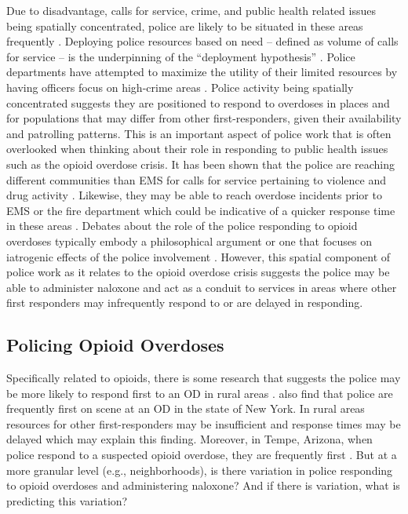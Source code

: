 Due to disadvantage, calls for service, crime, and public health related issues being spatially concentrated, police are likely to be situated in these areas frequently \parencite{engel_race_2012, mitchell_criminal_2011}. Deploying police resources based on need – defined as volume of calls for service – is the underpinning of the “deployment hypothesis” \parencite{alexander_war_2010, beckett_penal_2010}. Police departments have attempted to maximize the utility of their limited resources by having officers focus on high-crime areas \parencite{skogan_fairness_2004, weisburd_reforming_2003}. Police activity being spatially concentrated suggests they are positioned to respond to overdoses in places and for populations that may differ from other first-responders, given their availability and patrolling patterns. This is an important aspect of police work that is often overlooked when thinking about their role in responding to public health issues such as the opioid overdose crisis. It has been shown that the police are reaching different communities than EMS for calls for service pertaining to violence and drug activity \parencite{hibdon_concentration_2017, hibdon_going_2021}. Likewise, they may be able to reach overdose incidents prior to EMS or the fire department which could be indicative of a quicker response time in these areas \parencite{pourtaher_naloxone_2022, white_leveraging_2022}. Debates about the role of the police responding to opioid overdoses typically embody a philosophical argument or one that focuses on iatrogenic effects of the police involvement \parencite{doe-simkins_whose_2022, michaud_therapeutic_2023, van_der_meulen_thats_2021}. However, this spatial component of police work as it relates to the opioid overdose crisis suggests the police may be able to administer naloxone and act as a conduit to services in areas where other first responders may infrequently respond to or are delayed in responding. 

\subsection{Policing Opioid Overdoses}

Specifically related to opioids, there is some research that suggests the police may be more likely to respond first to an OD in rural areas \parencite{wood_overdose_2021}. \textcite{pourtaher_naloxone_2022} also find that police are frequently first on scene at an OD in the state of New York. In rural areas resources for other first-responders may be insufficient and response times may be delayed which may explain this finding. Moreover, in Tempe, Arizona, when police respond to a suspected opioid overdose, they are frequently first \parencite{white_leveraging_2022}. But at a more granular level (e.g., neighborhoods), is there variation in police responding to opioid overdoses and administering naloxone? And if there is variation, what is predicting this variation?

